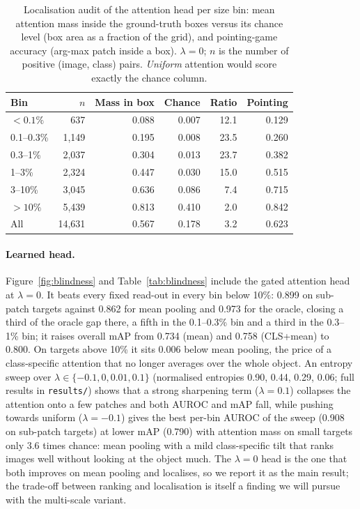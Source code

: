 \documentclass[10pt,letterpaper,twocolumn]{article}
\begin{document}
\begin{table}[t]
\centering\small
\caption{Localisation audit of the attention head per size bin: mean attention mass inside the
ground-truth boxes versus its chance level (box area as a fraction of the grid), and
pointing-game accuracy (arg-max patch inside a box). $\lambda=0$; $n$ is the number of
positive (image, class) pairs. \emph{Uniform} attention would score exactly the chance column.}
\label{tab:localisation}
\begin{tabular}{lrrrrr}
\toprule
Bin & $n$ & Mass in box & Chance & Ratio & Pointing \\
\midrule
$<0.1\%$     & 637   & 0.088 & 0.007 & 12.1 & 0.129 \\
0.1--0.3\%   & 1,149 & 0.195 & 0.008 & 23.5 & 0.260 \\
0.3--1\%     & 2,037 & 0.304 & 0.013 & 23.7 & 0.382 \\
1--3\%       & 2,324 & 0.447 & 0.030 & 15.0 & 0.515 \\
3--10\%      & 3,045 & 0.636 & 0.086 & 7.4  & 0.715 \\
$>10\%$      & 5,439 & 0.813 & 0.410 & 2.0  & 0.842 \\
\midrule
All          & 14,631 & 0.567 & 0.178 & 3.2 & 0.623 \\
\bottomrule
\end{tabular}
\end{table}

\paragraph{Learned head.}
Figure~\ref{fig:blindness} and Table~\ref{tab:blindness} include the gated attention head at
$\lambda=0$. It beats every fixed read-out in every bin below 10\%: 0.899 on sub-patch targets
against 0.862 for mean pooling and 0.973 for the oracle, closing a third of the oracle gap
there, a fifth in the 0.1--0.3\% bin and a third in the 0.3--1\% bin; it raises overall mAP from
0.734 (mean) and 0.758 (CLS+mean) to 0.800. On targets above 10\% it sits 0.006 below mean
pooling, the price of a class-specific attention that no longer averages over the whole object.
An entropy sweep over $\lambda\in\{-0.1, 0, 0.01, 0.1\}$ (normalised entropies 0.90, 0.44, 0.29, 0.06; full results in \texttt{results/}) shows that a strong sharpening term ($\lambda=0.1$) collapses the attention onto a few patches and both AUROC and mAP fall, while pushing towards uniform ($\lambda=-0.1$) gives the best per-bin AUROC of the sweep (0.908 on sub-patch targets) at lower mAP (0.790) with attention mass on small targets only 3.6 times chance: mean pooling with a mild class-specific tilt that ranks images well without looking at the object much. The
$\lambda=0$ head is the one that both improves on mean pooling and localises, so we report it
as the main result; the trade-off between ranking and localisation is itself a finding we will
pursue with the multi-scale variant.
\end{document}
